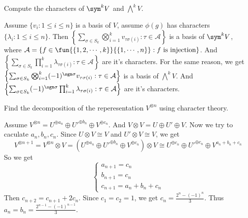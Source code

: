 \documentclass{ctexart}
\newif\ifpreface
\begin{document}
\large
\setlength{\baselineskip}{1.2em}
\ifpreface
    
\newgeometry{left=2cm,right=2cm,top=2cm,bottom=2cm}
\else
{}
\maketitle
\fi
\begin{problem}
  Compute the characters of \(\sym^k V \) and \(\bigwedge^k V\).
\end{problem}

\begin{solution}
  Assume \(\{ v_i:1 \leq i \leq n\}\) is a basis of \(V\), assume \(\phi( g)\) has characters \(\{ \lambda_i:1 \leq i \leq n\}\). 
  Then \(\left\{ \sum_{\sigma \in S_k} \bigotimes_{i=1}^{k} v_{\tau\sigma ( i)}:\tau \in \mathcal{A}\right\}\) is a basis of \(\sym^k V\), where \(\mathcal{A}=\left\{f \in \fun{\{ 1,2,\cdots,k\}}{\{ 1,\cdots,n\}}: f \text{ is injection}\right\}\). 
  And \(\left\{\sum_{\sigma \in S_k} \prod_{i=1}^{k} \lambda_{\tau \sigma( i)}:\tau \in \mathcal{A}\right\}\) are it's characters. 
  For the same reason, we get \\
  \(\left\{ \sum_{\sigma \in S_k} \bigotimes_{i=1}^{k} ( -1)^{\sgn \sigma}v_{\tau\sigma ( i)}:\tau \in \mathcal{A}\right\}\) is a basis of \(\bigwedge^k V\).
  And \(\left\{\sum_{\sigma \in S_k} ( -1)^{\sgn \sigma}\prod_{i=1}^{k} \lambda_{\tau \sigma( i)}:\tau \in \mathcal{A}\right\}\) are it's characters. 
\end{solution}

\begin{problem}
  Find the decomposition of the reperesentation \(V^{\otimes n}\) using character theory.  
\end{problem}

\begin{solution}
  Assume \(V^{\otimes n}=U^{\oplus a_n}\oplus U'^{\oplus b_n}\oplus V^{\oplus c_n}\). 
  And \(V \otimes V = U \oplus U' \oplus V\). Now we try to caculate \(a_n,b_n,c_n\). 
  Since \(U \otimes V \cong V\) and \(U' \otimes V \cong V\), we get 
  \[
    V^{\otimes n+1} = V^{\otimes n} \otimes V =( U^{\oplus a_n}\oplus U'^{\oplus b_n} \oplus V^{\oplus c_n})\otimes V \cong U^{\oplus c_n}\oplus U'^{\oplus c_n} \oplus V^{a_n+b_n+c_n}
  \]
  So we get 
  \[
    \begin{cases}
    a_{n+1}=c_n\\
    b_{n+1}=c_n\\
    c_{n+1}=a_n+b_n+c_n
    \end{cases}
  \]
  Then \(c_{n+2}=c_{n+1}+2c_n\). Since \(c_1=c_2=1\), we get \(c_n=\frac{2^n-( -1)^n}{3}\). 
  Thus \(a_n=b_n=\frac{2^{n-1}-( -1)^{n-1}}{3}\).
\end{solution}
\end{document}
